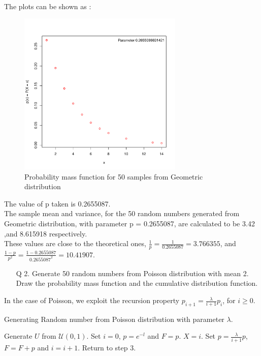 \documentclass[11pt]{article}
\begin{document}
\\
The plots can be shown as :
\begin{figure}[H]
	\centering
	\includegraphics[width=0.7\textwidth]{1.pdf}
		\caption{Probability mass function for 50 samples from Geometric distribution}
\end{figure}

The value of p taken is 0.2655087.\\
The sample mean and variance, for the 50 random numbers generated from Geometric distribution, with parameter p = 0.2655087, are calculated to be 3.42 ,and 8.615918 respectively.\\
These values are close to the theoretical ones, $\frac{1}{p} = \frac{1}{0.2655087} = 3.766355$, and $\frac{1 - p}{p^2} = \frac{1 - 0.2655087}{0.2655087^2} = 10.41907$.
\newpage
\begin{enumerate}
\item[Q 2.] Generate 50 random numbers from Poisson distribution with mean 2. Draw the probability mass function and the cumulative distribution function.
\end{enumerate}

In the case of Poisson, we exploit the recursion property $p_{i+1} = \frac{\lambda}{i + 1}p_i$, for $i \geq 0$.
\begin{algorithm}[H]
\caption{Generating Random number from Poisson distribution with parameter $\lambda$.}
\begin{algorithmic}[1]
\STATE Generate $U$ from $\mathcal{U}(0,1)$.
\STATE Set $i = 0$, $p = e^{-l}$ and $F = p$.
	\STATE $X = i$.
\ELSE
	\STATE Set $p = \frac{\lambda}{i + 1}p$, $F = F + p$ and $i = i + 1$.
	\STATE Return to step 3.
\ENDIF
\end{algorithmic}
\end{algorithm}
\end{document}
